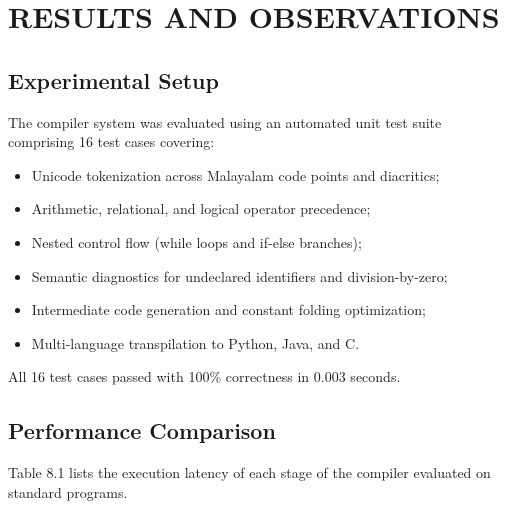 \documentclass[12pt,a4paper]{report}
\begin{document}
\newpage
\chapter{RESULTS AND OBSERVATIONS}

\section{Experimental Setup}
The compiler system was evaluated using an automated unit test suite comprising 16 test cases covering:
\begin{itemize}
    \item Unicode tokenization across Malayalam code points and diacritics;
    \item Arithmetic, relational, and logical operator precedence;
    \item Nested control flow (while loops and if-else branches);
    \item Semantic diagnostics for undeclared identifiers and division-by-zero;
    \item Intermediate code generation and constant folding optimization;
    \item Multi-language transpilation to Python, Java, and C.
\end{itemize}
All 16 test cases passed with 100\% correctness in 0.003 seconds.

\section{Performance Comparison}
Table 8.1 lists the execution latency of each stage of the compiler evaluated on standard programs.
\end{document}
